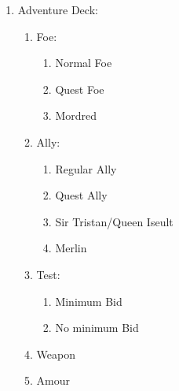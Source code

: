 \documentclass[11pt]{article}
\begin{document}
\begin{enumerate}
\begin{enumerate}
	\item Adventure Deck:
		\begin{enumerate}
   		\item Foe:
			\begin{enumerate}
			\item Normal Foe
			\item Quest Foe
			\item Mordred
			\end{enumerate}
    		\item Ally:
			\begin{enumerate}
			\item Regular Ally
			\item Quest Ally
			\item Sir Tristan/Queen Iseult
			\item Merlin
			\end{enumerate}
    		\item Test:
			\begin{enumerate}
			\item Minimum Bid
			\item No minimum Bid
			\end{enumerate}
    		\item Weapon
    		\item Amour
		\end{enumerate}
	\end{enumerate}
\end{enumerate}
\end{document}
